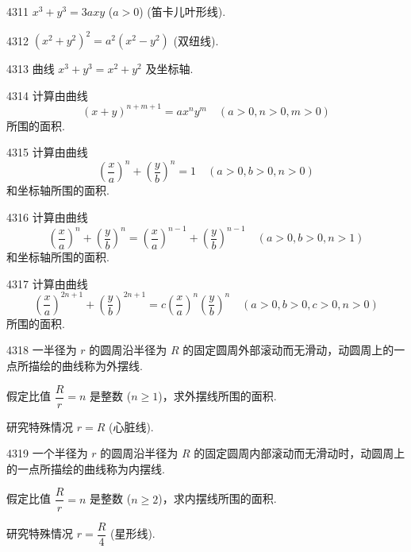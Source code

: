 \begin{prob}[S]{4311}
$x^3 + y^3 = 3axy$ ($a > 0$) (笛卡儿叶形线).
\end{prob}

\begin{prob}[S]{4312}
$(x^2 + y^2)^2 = a^2(x^2 - y^2)$ (双纽线).
\end{prob}

\begin{prob}[S]{4313}
曲线 $x^3 + y^3 = x^2 + y^2$ 及坐标轴.
\end{prob}

\begin{prob}[M]{4314}
计算由曲线
\[
(x + y)^{n+m+1} = ax^n y^m \quad (a > 0, n > 0, m > 0)
\]
所围的面积.
\end{prob}

\begin{prob}[M]{4315}
计算由曲线
\[
\left( \frac{x}{a} \right)^n + \left( \frac{y}{b} \right)^n = 1 \quad (a > 0, b > 0, n > 0)
\]
和坐标轴所围的面积.
\end{prob}

\begin{prob}[M]{4316}
计算由曲线
\[
\left( \frac{x}{a} \right)^n + \left( \frac{y}{b} \right)^n = \left( \frac{x}{a} \right)^{n-1} + \left( \frac{y}{b} \right)^{n-1} \quad (a > 0, b > 0, n > 1)
\]
和坐标轴所围的面积.
\end{prob}

\begin{prob}[M]{4317}
计算由曲线
\[
\left( \frac{x}{a} \right)^{2n+1} + \left( \frac{y}{b} \right)^{2n+1} = c \left( \frac{x}{a} \right)^n \left( \frac{y}{b} \right)^n \quad (a > 0, b > 0, c > 0, n > 0)
\]
所围的面积.
\end{prob}

\begin{prob}[M]{4318}
一半径为 $r$ 的圆周沿半径为 $R$ 的固定圆周外部滚动而无滑动，动圆周上的一点所描绘的曲线称为外摆线.

假定比值 $\dfrac{R}{r} = n$ 是整数 ($n \geqslant 1$)，求外摆线所围的面积.

研究特殊情况 $r = R$ (心脏线).
\end{prob}

\begin{prob}[M]{4319}
一个半径为 $r$ 的圆周沿半径为 $R$ 的固定圆周内部滚动而无滑动时，动圆周上的一点所描绘的曲线称为内摆线.

假定比值 $\dfrac{R}{r} = n$ 是整数 ($n \geqslant 2$)，求内摆线所围的面积.

研究特殊情况 $r = \dfrac{R}{4}$ (星形线).
\end{prob}


